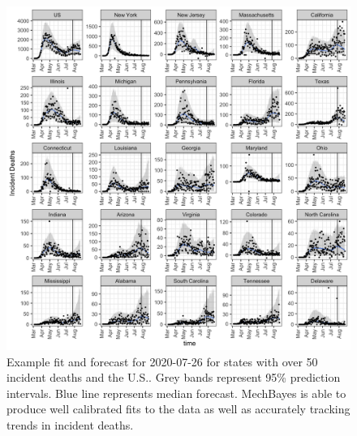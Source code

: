 \documentclass{umassthesis}          %
\begin{document}
\begin{figure}

    \includegraphics[scale=.2]{fit_and_forecast_results.png}

\caption{Example fit and forecast for 2020-07-26 for states with over 50 incident deaths and the U.S.. Grey bands represent 95\% prediction intervals. Blue line represents median forecast. MechBayes is able to produce well calibrated fits to the data as well as accurately tracking trends in incident deaths.}
\label{fig:fit_and_forecast_results}
\end{figure}

	
 
\end{document}
